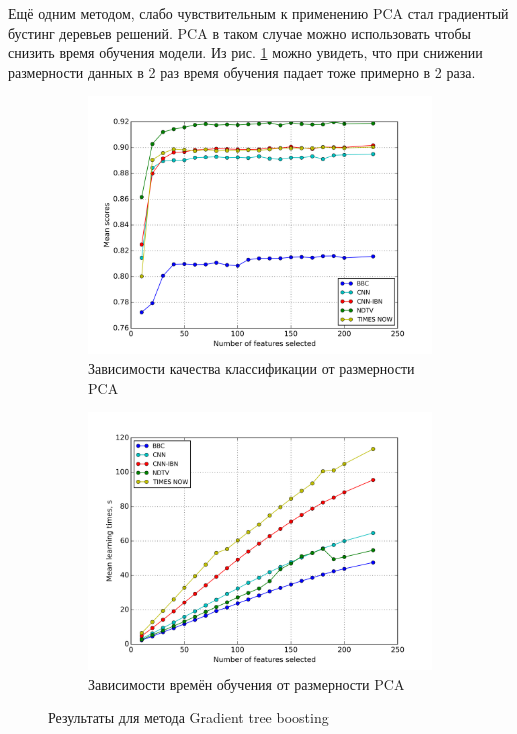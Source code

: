 \par
Ещё одним методом, слабо чувствительным к применению PCA стал градиентый бустинг деревьев решений. PCA в таком случае можно использовать чтобы снизить время обучения модели. Из рис. \ref{fig:gtb_pca} можно увидеть, что при снижении размерности данных в 2 раз время обучения падает тоже примерно в 2 раза.

\begin{figure}[h!]
    \centering
	\begin{subfigure}{0.45\textwidth}
		\includegraphics[width=\textwidth]{images/PCA-GTB.png}
		\caption{Зависимости качества классификации от размерности PCA}
	\end{subfigure}
	\begin{subfigure}{0.45\textwidth}
		\includegraphics[width=\textwidth]{images/PCA-GTBTime.png}
		\caption{Зависимости времён обучения от размерности PCA}
	\end{subfigure}
	\caption{Результаты для метода Gradient tree boosting}\label{fig:gtb_pca}
\end{figure}

